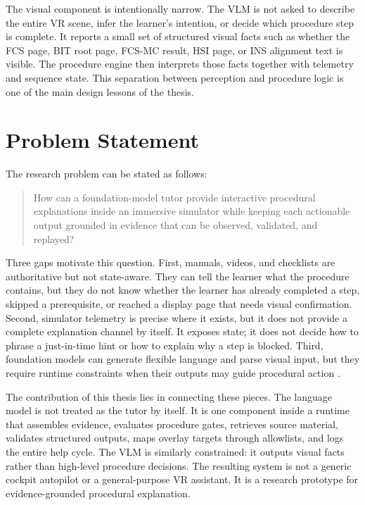 The visual component is intentionally narrow. The VLM is not asked to describe
the entire VR scene, infer the learner's intention, or decide which procedure
step is complete. It reports a small set of structured visual facts such as
whether the FCS page, BIT root page, FCS-MC result, HSI page, or INS alignment
text is visible. The procedure engine then interprets those facts together
with telemetry and sequence state. This separation between perception and
procedure logic is one of the main design lessons of the thesis.

\section{Problem Statement}\label{sec:intro-problem}

The research problem can be stated as follows:

\begin{quote}
How can a foundation-model tutor provide interactive procedural explanations
inside an immersive simulator while keeping each actionable output grounded in
evidence that can be observed, validated, and replayed?
\end{quote}

Three gaps motivate this question. First, manuals, videos, and checklists are
authoritative but not state-aware. They can tell the learner what the procedure
contains, but they do not know whether the learner has already completed a
step, skipped a prerequisite, or reached a display page that needs visual
confirmation. Second, simulator telemetry is precise where it exists, but it
does not provide a complete explanation channel by itself. It exposes state; it
does not decide how to phrase a just-in-time hint or how to explain why a step
is blocked. Third, foundation models can generate flexible language and parse
visual input, but they require runtime constraints when their outputs may guide
procedural action \citep{vaswani2017attention,gunning2019xai,amershi2019guidelines}.

The contribution of this thesis lies in connecting these pieces. The language
model is not treated as the tutor by itself. It is one component inside a
runtime that assembles evidence, evaluates procedure gates, retrieves source
material, validates structured outputs, maps overlay targets through allowlists,
and logs the entire help cycle. The VLM is similarly constrained: it outputs
visual facts rather than high-level procedure decisions. The resulting system
is not a generic cockpit autopilot or a general-purpose VR assistant. It is a
research prototype for evidence-grounded procedural explanation.

